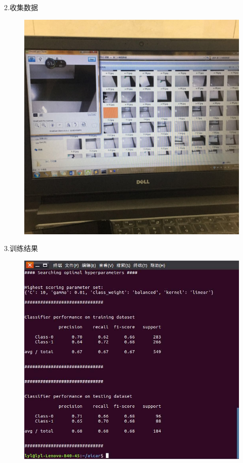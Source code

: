 \documentclass[19pt,a4paper]{article}
\begin{document}
\indent 2.收集数据
\begin{figure}[H]
 \centering
 \includegraphics[scale=0.2]{4.jpeg}
\end{figure}
\indent 3.训练结果
\begin{figure}[H]
 \centering
 \includegraphics[scale=0.4]{5.jpeg}
\end{figure}
\end{document}

